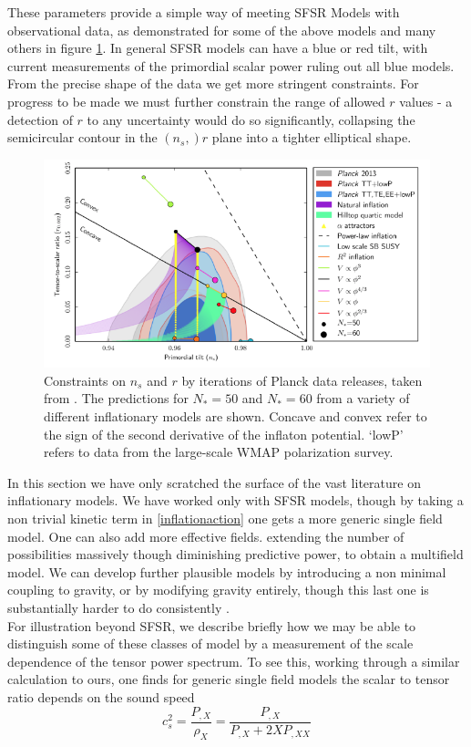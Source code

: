 \documentclass[a4paper,10pt]{article}
\begin{document}
These parameters provide a simple way of meeting SFSR Models with observational data, as demonstrated for some of the above models and many others in figure \ref{inflationconstraints}. In general SFSR models can have a blue or red tilt, with current measurements of the primordial scalar power ruling out all blue models. From the precise shape of the data we get more stringent constraints. For progress to be made we must further constrain the range of allowed $r$ values - a detection of $r$ to any uncertainty would do so significantly, collapsing the semicircular contour in the $(n_s,)r$ plane into a tighter elliptical shape.

\begin{figure}[h]
  \includegraphics[width=0.7\linewidth]{modeldepconstraints.png}
  \centering
  \caption{Constraints on $n_s$ and $r$ by iterations of Planck data releases, taken from \cite{QBM}. The predictions for $N_*=50$ and $N_*=60$ from a variety of different inflationary models are shown. Concave and convex refer to the sign of the second derivative of the inflaton potential. `lowP' refers to data from the large-scale WMAP polarization survey.}
\label{inflationconstraints}  
\end{figure}


In this section we have only scratched the surface of the vast literature on inflationary models. We have worked only with SFSR models, though by taking a non trivial kinetic term in \ref{inflationaction} one gets a more generic single field model. One can also add more effective fields. extending the number of possibilities massively though diminishing predictive power, to obtain a multifield model. We can develop further plausible models by introducing a non minimal coupling to gravity, or by modifying gravity entirely, though this last one is substantially harder to do consistently \cite{baumannTASILecturesInflation2012}.\\

For illustration beyond SFSR, we describe briefly how we may be able to distinguish some of these classes of model by a measurement of the scale dependence of the tensor power spectrum. To see this, working through a similar calculation to ours, one finds for generic single field models the scalar to tensor ratio depends on the sound speed \cite{CMBPol}
\begin{equation}
c_s^2 = \frac{P_{,X}}{\rho_X} = \frac{P_{,X}}{P_{,X}+2XP_{,XX}}
\end{equation}
\end{document}
